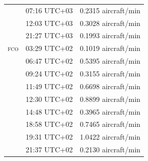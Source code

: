\documentclass[]{elsarticle}
\newcommand{\airp}[1]{\textcolor{#1}{\textsc{#1}}}
\begin{document}
\begin{center}
\begin{longtable}{lll}
           & 07:16 UTC+03 &  0.2315 aircraft/min \\
           & 12:03 UTC+03 &  0.3028 aircraft/min \\
           & 21:27 UTC+03 &  0.1993 aircraft/min \\
      \airp{fco} & 03:29 UTC+02 &  0.1019 aircraft/min \\
           & 06:47 UTC+02 &  0.5395 aircraft/min \\
           & 09:24 UTC+02 &  0.3155 aircraft/min \\
           & 11:49 UTC+02 &  0.6698 aircraft/min \\
           & 12:30 UTC+02 &  0.8899 aircraft/min \\
           & 14:48 UTC+02 &  0.3965 aircraft/min \\
           & 18:58 UTC+02 &  0.7465 aircraft/min \\
           & 19:31 UTC+02 &  1.0422 aircraft/min \\
           & 21:37 UTC+02 &  0.2130 aircraft/min \\
    \end{longtable}
  \end{center}
\end{document}
